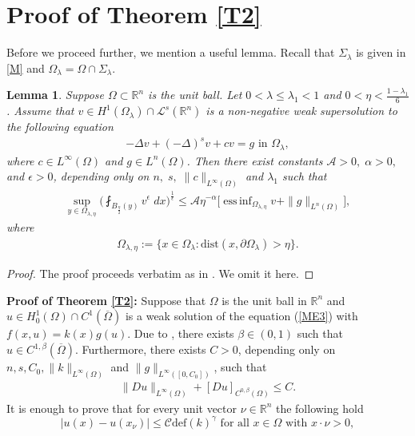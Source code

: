 \documentclass[11pt, notitlepage]{article}
\def\R{\mathbb{R}}
\DeclareMathOperator*{\essinf}{ess\,inf}
\newcommand{\De} {\Delta}
\newcommand{\la} {\lambda}
\newtheorem{Lemma}[Theorem]{Lemma}
\begin{document}
{\section{Proof of Theorem \ref{T2}}
 Before we proceed further, we mention a useful lemma. Recall that $\Sigma_\lambda$ is given in \eqref{M} and $\Omega_\lambda=\Omega\cap \Sigma_\lambda$.
\begin{Lemma}\label{PLD}
    Suppose $\Omega\subset\R^n$ is the unit ball. Let $0<\lambda\leq \lambda_1<1$ and $0<\eta<\frac{1-\lambda_1}{6}$. Assume that $v\in H^1(\Omega_\lambda)\cap \mathcal{L}^s(\R^n)$ is a non-negative weak supersolution to the following equation
    \begin{align*}
        -\De v+(-\De)^sv+cv=g \text{ in }\Omega_\lambda,
    \end{align*}
where $c\in L^\infty(\Omega)$ and $g\in L^n(\Omega)$. Then there exist constants $\mathcal{A}>0,\;\alpha>0,$ and $\epsilon>0$, depending only on $n,\;s,\;\|c\|_{L^\infty(\Omega)}$ and $\lambda_1$ such that
 \begin{align*}
     \sup_{y\in \Omega_{\lambda,\eta}}\Big(\fint_{B_\frac{\eta}{2}(y)}v^\epsilon\;dx\Big)^\frac{1}{\epsilon}\leq \mathcal{A}\eta^{-\alpha}\Big[\essinf_{\Omega_{\lambda,\eta}}v+\|g\|_{L^n(\Omega)}\Big],
 \end{align*}
 where
 \begin{align}\label{nbd}
     \Omega_{\lambda,\eta}:=\{x\in\Omega_\la: \mathrm{dist}(x,\partial\Omega_\lambda)>\eta\}.
 \end{align}
\end{Lemma}
\begin{proof}
The proof proceeds verbatim as in \cite[Corollary 2.3]{Cozzi24}. We omit it here.
\end{proof}
\textbf{Proof of Theorem \ref{T2}:} Suppose that $\Omega$ is the unit ball in $\R^n$ and $u\in H^1_0(\Omega)\cap C^1(\overline{\Omega})$ is a weak solution of the equation (\ref{ME3}) with $f(x,u)=k(x)g(u)$. Due to \cite[Theorem 2.7]{Valdinoci23}, there exists $\beta\in(0,1)$ such that $u\in C^{1,\beta}(\overline{\Omega})$. Furthermore, there exists $C>0$, depending only on $n,s,C_0,\|k\|_{L^\infty(\Omega)}$ and $\|g\|_{L^\infty([0,C_0])}$, such that 
\begin{align}\label{Bdd}
    \|Du\|_{L^\infty(\Omega)}+[Du]_{C^{0,\beta}(\Omega)}\leq C.
\end{align}
It is enough to prove that for every unit vector $\nu\in\R^n$ the following hold
$$|u(x)-u(x_\nu)|\leq \mathscr{C}\mathrm{def}(k)^\gamma \text{ for all }x\in \Omega \text{ with } x\cdot \nu>0,$$
}
\end{document}
